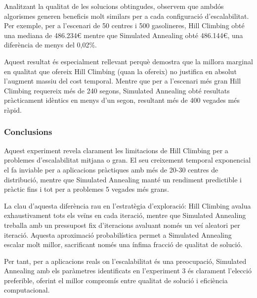 
\vspace{0.5cm}

Analitzant la qualitat de les solucions obtingudes, observem que ambdós algorismes generen beneficis molt similars per a cada configuració d'escalabilitat. Per exemple, per a l'escenari de 50 centres i 500 gasolineres, Hill Climbing obté una mediana de 486.234€ mentre que Simulated Annealing obté 486.144€, una diferència de menys del 0,02\%.

Aquest resultat és especialment rellevant perquè demostra que la millora marginal en qualitat que ofereix Hill Climbing (quan la ofereix) no justifica en absolut l'augment massiu del cost temporal. Mentre que per a l'escenari més gran Hill Climbing requereix més de 240 segons, Simulated Annealing obté resultats pràcticament idèntics en menys d'un segon, resultant més de 400 vegades més ràpid.

\subsubsection{Conclusions}

Aquest experiment revela clarament les limitacions de Hill Climbing per a problemes d'escalabilitat mitjana o gran. El seu creixement temporal exponencial el fa inviable per a aplicacions pràctiques amb més de 20-30 centres de distribució, mentre que Simulated Annealing manté un rendiment predictible i pràctic fins i tot per a problemes 5 vegades més grans.

La clau d'aquesta diferència rau en l'estratègia d'exploració: Hill Climbing avalua exhaustivament tots els veïns en cada iteració, mentre que Simulated Annealing treballa amb un pressupost fix d'iteracions avaluant només un veí aleatori per iteració. Aquesta aproximació probabilística permet a Simulated Annealing escalar molt millor, sacrificant només una ínfima fracció de qualitat de solució.

Per tant, per a aplicacions reals on l'escalabilitat és una preocupació, Simulated Annealing amb els paràmetres identificats en l'experiment 3 és clarament l'elecció preferible, oferint el millor compromís entre qualitat de solució i eficiència computacional.
